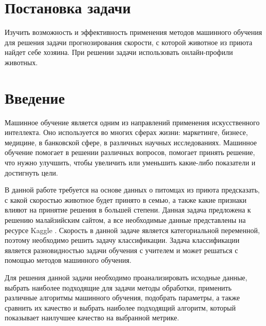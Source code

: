 \documentclass[14pt]{mmcs_article}
\begin{document}

\renewcommand{\contentsname}{Оглавление}

\tableofcontents

\newpage
{}

\section*{Постановка задачи}


Изучить возможность и эффективность применения методов машинного обучения для решения задачи прогнозирования скорости, с которой животное из приюта найдет себе хозяина. При решении задачи использовать онлайн-профили животных.


\newpage
{}
\section*{Введение}

Машинное обучение является одним из направлений применения искусственного интеллекта. Оно используется во многих сферах жизни: маркетинге, бизнесе, медицине, в банковской сфере, в различных научных исследованиях. Машинное обучение помогает в решении различных вопросов, помогает принять решение, что нужно улучшить, чтобы увеличить или уменьшить какие-либо показатели и достигнуть цели. 

В данной работе требуется на основе данных о питомцах из приюта предсказать, с какой скоростью животное будет принято в семью, а также какие признаки влияют на принятие решения в большей степени. Данная задача предложена к решению малайзийским сайтом, а все необходимые данные представлены на ресурсе Kaggle \cite{lib:taskkaggle}. Скорость в данной задаче является категориальной переменной, поэтому необходимо решить задачу классификации. Задача классификации является разновидностью задачи обучения с учителем и может решаться с помощью методов машинного обучения. 

Для решения данной задачи необходимо проанализировать исходные данные, выбрать наиболее подходящие для задачи методы обработки, применить различные алгоритмы машинного обучения, подобрать параметры, а также сравнить их качество и выбрать наиболее подходящий алгоритм, который показывает наилучшее качество на выбранной метрике.
\end{document}
